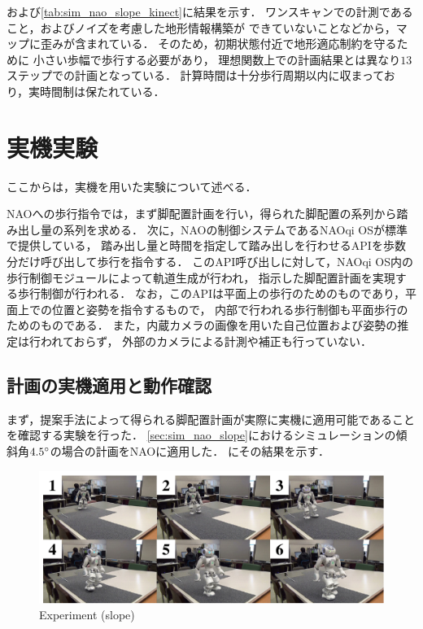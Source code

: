 \documentclass[autodetect-engine,dvipdfmx-if-dvi,ja=standard,a4j,jbase=11pt,magstyle=nomag*]{bxjsreport}
\begin{document}
および\cref{tab:sim_nao_slope_kinect}に結果を示す．
ワンスキャンでの計測であること，およびノイズを考慮した地形情報構築が
できていないことなどから，マップに歪みが含まれている．
そのため，初期状態付近で地形適応制約を守るために
小さい歩幅で歩行する必要があり，
理想関数上での計画結果とは異なり$13$ステップでの計画となっている．
計算時間は十分歩行周期以内に収まっており，実時間制は保たれている．


\section{実機実験}
ここからは，実機を用いた実験について述べる．

NAOへの歩行指令では，まず脚配置計画を行い，得られた脚配置の系列から踏み出し量の系列を求める．
次に，NAOの制御システムであるNAOqi OSが標準で提供している，
踏み出し量と時間を指定して踏み出しを行わせるAPIを歩数分だけ呼び出して歩行を指令する．
このAPI呼び出しに対して，NAOqi OS内の歩行制御モジュールによって軌道生成が行われ，
指示した脚配置計画を実現する歩行制御が行われる．
なお，このAPIは平面上の歩行のためのものであり，平面上での位置と姿勢を指令するもので，
内部で行われる歩行制御も平面歩行のためのものである．
また，内蔵カメラの画像を用いた自己位置および姿勢の推定は行われておらず，
外部のカメラによる計測や補正も行っていない．


\subsection{計画の実機適用と動作確認}
まず，提案手法によって得られる脚配置計画が実際に実機に適用可能であることを確認する実験を行った．
\cref{sec:sim_nao_slope}におけるシミュレーションの傾斜角$4.5\degree$の場合の計画をNAOに適用した．
にその結果を示す．

\begin{figure}[t]
    \centering
    \includegraphics[width=1.0\linewidth, clip]{./figure/fig10.pdf}
    \caption{Experiment (slope)}
    \label{fig:sim_nao_slope_45_exp}
\end{figure}
\end{document}
